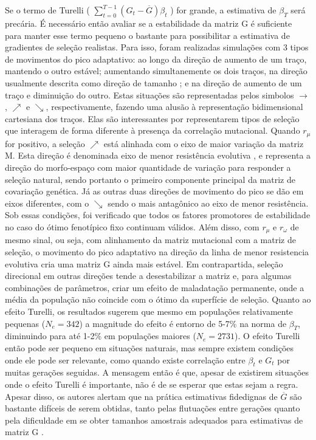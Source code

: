 Se o termo de Turelli (  $\sum_{t=0}^{T-1} (G_t - \overline {G})
\beta_t$ ) for grande, a estimativa de $\beta_T$ será precária. 
É necessário então avaliar se a estabilidade da matriz G é suficiente
para manter esse termo pequeno o bastante para possibilitar a
estimativa de gradientes de seleção realistas. 
Para isso, foram realizadas simulações com 3 tipos de movimentos do pico
adaptativo: ao longo da direção de aumento de um traço, mantendo o outro
estável; aumentando simultanemente os dois traços, na direção usualmente
descrita como direção de tamanho \citep{Marroig2005}; e na direção de
aumento de um traço e diminuição do outro. 
Estas situações são representadas pelos simbolos $\rightarrow$,
$\nearrow$ e $\searrow$, respectivamente, fazendo uma alusão à
representação bidimensional cartesiana dos traços. 
Elas são interessantes por representarem tipos de seleção que interagem
de forma diferente à presença da correlação mutacional. 
Quando $r_\mu$ for positivo, a seleção $\nearrow$ está alinhada com o
eixo de maior variação da matriz M. 
Esta direção é denominada eixo de menor resistência evolutiva
\citep{Schluter1996}, e  representa a direção do morfo-espaço com maior
quantidade de variação para responder a seleção natural, sendo portanto
o primeiro componente principal da matriz de covariação genética. 
Já as outras duas direções de movimento do pico se dão em eixos
diferentes, com o $\searrow$ sendo o mais antagônico ao eixo de menor
resistência. 
Sob essas condições, foi verificado que todos os fatores promotores de
estabilidade no caso do ótimo fenotípico fixo continuam válidos. 
Além disso, com $r_\mu$ e $r_\omega$ de mesmo sinal, ou seja, com
alinhamento da matriz mutacional com a matriz de seleção, o movimento
do pico adaptativo na direção da linha de menor resistencia evolutiva
cria uma matriz G ainda mais estável. 
Em contrapartida, seleção direcional em outras direções tende a
desestabilizar a matriz e, para algumas combinações de parâmetros, criar
um efeito de maladatação permanente, onde a média da população não
coincide com o ótimo da superfície de seleção. 
Quanto ao efeito Turelli, os resultados sugerem que mesmo em populações
relativamente pequenas ($N_e=342$) a magnitude do efeito é entorno de
5-7\% na norma de $\beta_T$, diminuindo para até 1-2\% em populações
maiores ($N_e=2731$). 
O efeito Turelli então pode ser pequeno em situações naturais, mas
sempre existem condições onde ele pode ser relevante, como quando existe
correlação entre $\beta_t$ e $G_t$ por muitas gerações seguidas. 
A mensagem então é que, apesar de existirem situações onde o efeito
Turelli é importante, não é de se esperar que estas sejam a regra. 
Apesar disso, os autores alertam que na prática estimativas fidedignas
de $\overline {G}$ são bastante difíceis de serem obtidas, tanto pelas
flutuações entre gerações quanto pela dificuldade em se obter tamanhos
amostrais adequados para estimativas de matriz G \citep{Marroig2011b}.

